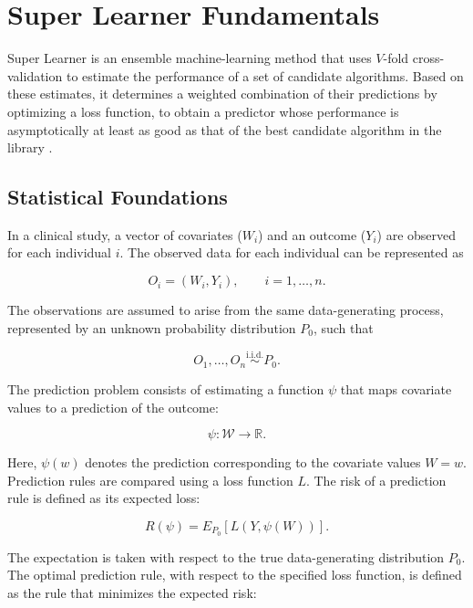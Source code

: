 \documentclass[12pt]{article}
\begin{document}
\section{Super Learner Fundamentals}
Super Learner is an ensemble machine-learning method that uses $V$-fold cross-validation to estimate the performance of a set of candidate algorithms. Based on these estimates, it determines a weighted combination of their predictions by optimizing a loss function, to obtain a predictor whose performance is asymptotically at least as good as that of the best candidate algorithm in the library \cite{vanDerLaan2007}.

\subsection{Statistical Foundations}
In a clinical study, a vector of covariates ($W_i$) and an outcome ($Y_i$) are observed for each individual $i$. The observed data for each individual can be represented as

\begin{equation}
    O_i = (W_i, Y_i), \qquad i = 1, \ldots, n.
\end{equation}

The observations are assumed to arise from the same data-generating process, represented by an unknown probability distribution $P_0$, such that

\begin{equation}
    O_1,\ldots,O_n \overset{\mathrm{i.i.d.}}{\sim} P_0.
\end{equation}

The prediction problem consists of estimating a function $\psi$ that maps covariate values to a prediction of the outcome:

\begin{equation}
    \psi: \mathcal{W} \rightarrow \mathbb{R}.
\end{equation}

Here, $\psi(w)$ denotes the prediction corresponding to the covariate values $W=w$.
Prediction rules are compared using a loss function $L$. The risk of a prediction rule is defined as its expected loss:

\begin{equation}
    R(\psi) = E_{P_0}\left[L\left(Y,\psi(W)\right)\right].
\end{equation}

The expectation is taken with respect to the true data-generating distribution $P_0$.
The optimal prediction rule, with respect to the specified loss function, is defined as the rule that minimizes the expected risk:
\end{document}
